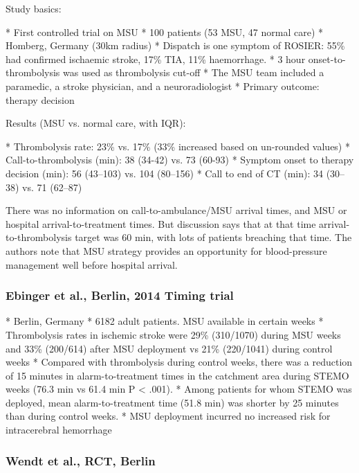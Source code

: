 Study basics:

\begin{markdown}
* First controlled trial on MSU
* 100 patients (53 MSU, 47 normal care)
* Homberg, Germany (30km radius)
* Dispatch is one symptom of ROSIER: 55\% had confirmed ischaemic stroke, 17\% TIA, 11\% haemorrhage.
* 3 hour onset-to-thrombolysis was used as thrombolysis cut-off
* The MSU team included a paramedic, a stroke physician, and a neuroradiologist
* Primary outcome: therapy decision
\end{markdown}

Results (MSU vs. normal care, with IQR):

\begin{markdown}
* Thrombolysis rate: 23\% vs. 17\% (33\% increased based on un-rounded values)
* Call-to-thrombolysis (min): 38 (34-42) vs. 73 (60-93)
* Symptom onset to therapy decision (min): 56 (43–103) vs. 104 (80–156)
* Call to end of CT (min): 34 (30–38) vs. 71 (62–87)
\end{markdown}

There was no information on call-to-ambulance/MSU arrival times, and MSU or hospital arrival-to-treatment times. But discussion says that at that time arrival-to-thrombolysis target was 60 min, with lots of patients breaching that time. The authors note that MSU strategy provides an opportunity for  blood-pressure management well before hospital arrival.

\subsubsection{Ebinger et al., Berlin, 2014 Timing trial \cite{ebinger_effect_2014}}

\begin{markdown}
* Berlin, Germany
* 6182 adult patients. MSU available in certain weeks
* Thrombolysis rates in ischemic stroke were 29\% (310/1070) during MSU weeks and 33\% (200/614) after MSU deployment vs 21\% (220/1041) during control weeks
* Compared with thrombolysis during control weeks, there was a reduction of 15 minutes in alarm-to-treatment times in the catchment area during STEMO weeks (76.3 min vs 61.4 min P < .001).
* Among patients for whom STEMO was deployed, mean alarm-to-treatment time (51.8 min) was shorter by 25 minutes than during control weeks.
* MSU deployment incurred no increased risk for intracerebral hemorrhage 
\end{markdown}

\subsubsection{Wendt et al., RCT, Berlin \cite{wendt_improved_2015}}

